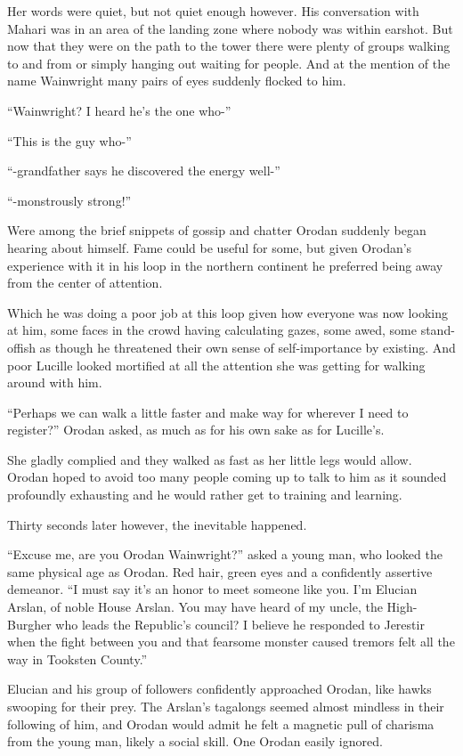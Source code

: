\documentclass[a4paper,10pt]{book}
\begin{document}
Her words were quiet, but not quiet enough however. His conversation with Mahari was in an area of the landing zone where nobody was within earshot. But now that they were on the path to the tower there were plenty of groups walking to and from or simply hanging out waiting for people. And at the mention of the name Wainwright many pairs of eyes suddenly flocked to him.\par
“Wainwright? I heard he’s the one who-”\par
“This is the guy who-”\par
“-grandfather says he discovered the energy well-”\par
“-monstrously strong!”\par
Were among the brief snippets of gossip and chatter Orodan suddenly began hearing about himself. Fame could be useful for some, but given Orodan’s experience with it in his loop in the northern continent he preferred being away from the center of attention.\par
Which he was doing a poor job at this loop given how everyone was now looking at him, some faces in the crowd having calculating gazes, some awed, some stand-offish as though he threatened their own sense of self-importance by existing. And poor Lucille looked mortified at all the attention she was getting for walking around with him.\par
“Perhaps we can walk a little faster and make way for wherever I need to register?” Orodan asked, as much as for his own sake as for Lucille’s.\par
She gladly complied and they walked as fast as her little legs would allow. Orodan hoped to avoid too many people coming up to talk to him as it sounded profoundly exhausting and he would rather get to training and learning.\par
Thirty seconds later however, the inevitable happened.\par
“Excuse me, are you Orodan Wainwright?” asked a young man, who looked the same physical age as Orodan. Red hair, green eyes and a confidently assertive demeanor. “I must say it’s an honor to meet someone like you. I’m Elucian Arslan, of noble House Arslan. You may have heard of my uncle, the High-Burgher who leads the Republic’s council? I believe he responded to Jerestir when the fight between you and that fearsome monster caused tremors felt all the way in Tooksten County.”\par
Elucian and his group of followers confidently approached Orodan, like hawks swooping for their prey. The Arslan’s tagalongs seemed almost mindless in their following of him, and Orodan would admit he felt a magnetic pull of charisma from the young man, likely a social skill. One Orodan easily ignored.\par
\end{document}

